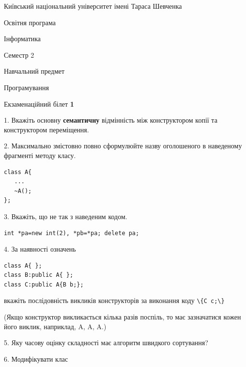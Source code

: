 \documentclass[12pt, ukrainian]{article}
\def\code#1{\Verb!#1!}
\begin{document}
{{\begin {scriptsize}\par
{ \center  Київський національний університет імені Тараса Шевченка \par}
{\parbox {5 cm}{Освітня програма \hfill}{\parbox {7 cm}{Інформатика\hfill}}\parbox {6 cm}{\hfill Семестр 2}}\par
{\parbox {5 cm} {Навчальний предмет \hfill}\parbox {7 cm}{Програмування \hfill}\parbox {6cm}{\hfill}\par}\vspace{-15pt} \end{scriptsize}}{\center Екзаменаційний білет \No \textbf { 1 }\par}}
{%
1. Вкажіть основну \textbf{семантичну} відмінність між конструктором копії та конструктором переміщення.%
\par
\vspace{2mm}
2. Максимально змістовно повно сформулюйте назву оголошеного в наведеному фрагменті методу класу.
\vspace{-3mm}
\begin{verbatim}class A{
   ...
   ~A();
};\end{verbatim}
\vspace{-3mm}
\par
\vspace{2mm}
3. Вкажіть, що не так з наведеним кодом.
\vspace{-3mm}
\begin{verbatim}int *pa=new int(2), *pb=*pa; delete pa;\end{verbatim}
\vspace{-3mm}
\par
\vspace{2mm}
4. За наявності означень
\vspace{-3mm}
\begin{verbatim}
class A{ };
class B:public A{ };
class C:public A{B b;};\end{verbatim}
\vspace{-3mm}
вкажіть послідовність викликів конструкторів за виконання коду \code{\{C c;\}} 

(Якщо конструктор викликається кілька разів поспіль, то має зазначатися кожен його виклик, наприклад, A, A, A.)

\vspace{2mm}
5. Яку часову оцінку складності має алгоритм швидкого сортування?
\par
\vspace{2mm}
6. Модифікувати клас 

}
\end{document}
